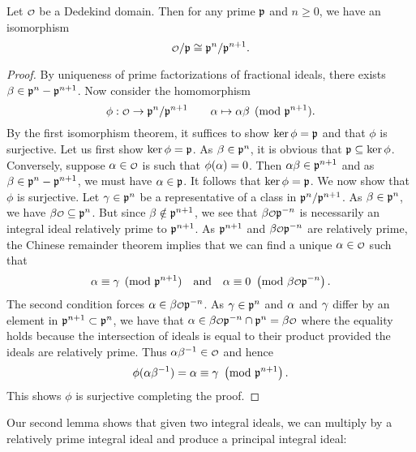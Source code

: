     \begin{lemma}\label{lem:isomorphism_of_quotient_by_prime_integral_ideals}
      Let $\smc{O}$ be a Dedekind domain. Then for any prime $\mathfrak{p}$ and $n \ge 0$, we have an isomorphism
      \[
        \smc{O}/\mf{p} \cong \mf{p}^{n}/\mf{p}^{n+1}.
      \]
    \end{lemma}
    \begin{proof}
      By uniqueness of prime factorizations of fractional ideals, there exists $\beta \in \mathfrak{p}^{n}-\mathfrak{p}^{n+1}$. Now consider the homomorphism
      \[
        \phi:\smc{O} \to \mf{p}^{n}/\mf{p}^{n+1} \qquad \a \mapsto \a\b \pmod{\mf{p}^{n+1}}.
      \]
      By the first isomorphism theorem, it suffices to show $\ker\phi = \mathfrak{p}$ and that $\phi$ is surjective. Let us first show $\ker\phi = \mathfrak{p}$. As $\beta \in \mathfrak{p}^{n}$, it is obvious that $\mathfrak{p} \subseteq \ker\phi$. Conversely, suppose $\a \in \smc{O}$ is such that $\phi(\alpha) = 0$. Then $\alpha\beta \in \mathfrak{p}^{n+1}$ and as $\beta \in \mathfrak{p}^{n}-\mathfrak{p}^{n+1}$, we must have $\alpha \in \mathfrak{p}$. It follows that $\ker\phi = \mathfrak{p}$. We now show that $\phi$ is surjective. Let $\gamma \in \mathfrak{p}^{n}$ be a representative of a class in $\mathfrak{p}^{n}/\mathfrak{p}^{n+1}$. As $\beta \in \mathfrak{p}^{n}$, we have $\b\smc{O} \subseteq \mf{p}^{n}$. But since $\beta \notin \mathfrak{p}^{n+1}$, we see that $\b\smc{O}\mf{p}^{-n}$ is necessarily an integral ideal relatively prime to $\mathfrak{p}^{n+1}$. As $\mathfrak{p}^{n+1}$ and $\b\smc{O}\mf{p}^{-n}$ are relatively prime, the Chinese remainder theorem implies that we can find a unique $\a \in \smc{O}$ such that
      \[
        \a \equiv \g \pmod{\mf{p}^{n+1}} \quad \text{and} \quad \a \equiv 0 \tmod{\b\smc{O}\mf{p}^{-n}}.
      \]
      The second condition forces $\a \in \b\smc{O}\mf{p}^{-n}$. As $\gamma \in \mathfrak{p}^{n}$ and $\alpha$ and $\gamma$ differ by an element in $\mathfrak{p}^{n+1} \subset \mathfrak{p}^{n}$, we have that $\a \in \b\smc{O}\mf{p}^{-n} \cap \mf{p}^{n} = \b\smc{O}$ where the equality holds because the intersection of ideals is equal to their product provided the ideals are relatively prime. Thus $\a\b^{-1} \in \smc{O}$ and hence
      \[
        \phi(\alpha\beta^{-1}) = \alpha \equiv \gamma \ \left(\text{mod }\mathfrak{p}^{n+1}\right).
      \]
      This shows $\phi$ is surjective completing the proof.
    \end{proof}

    Our second lemma shows that given two integral ideals, we can multiply by a relatively prime integral ideal and produce a principal integral ideal:

